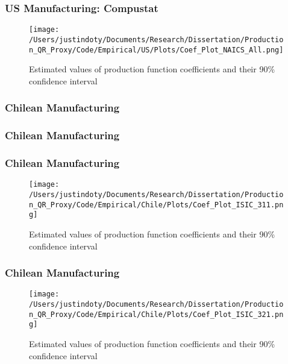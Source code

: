 \documentclass{beamer}
\begin{document}
\begin{frame}
\frametitle{US Manufacturing: Compustat}
\begin{figure}[ht]
\centering
\texttt{[image: /Users/justindoty/Documents/Research/Dissertation/Production\_QR\_Proxy/Code/Empirical/US/Plots/Coef\_Plot\_NAICS\_All.png]}
\caption{Estimated values of production function coefficients and their 90\% confidence interval}
\end{figure}
\end{frame}


\begin{frame}
\frametitle{Chilean Manufacturing}
\scriptsize

\end{frame}

\begin{frame}
\frametitle{Chilean Manufacturing}
\scriptsize

\end{frame}

\begin{frame}
\frametitle{Chilean Manufacturing}
\begin{figure}[ht]
\centering
\texttt{[image: /Users/justindoty/Documents/Research/Dissertation/Production\_QR\_Proxy/Code/Empirical/Chile/Plots/Coef\_Plot\_ISIC\_311.png]}
\caption{Estimated values of production function coefficients and their 90\% confidence interval}
\end{figure}
\end{frame}

\begin{frame}
\frametitle{Chilean Manufacturing}
\begin{figure}[ht]
\centering
\texttt{[image: /Users/justindoty/Documents/Research/Dissertation/Production\_QR\_Proxy/Code/Empirical/Chile/Plots/Coef\_Plot\_ISIC\_321.png]}
\caption{Estimated values of production function coefficients and their 90\% confidence interval}
\end{figure}
\end{frame}
\end{document}

